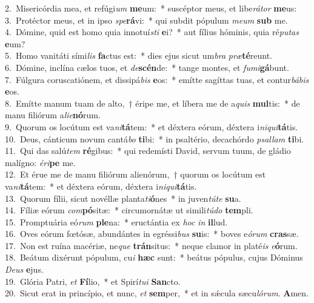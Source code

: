 {2.~}Misericórdia mea, et refúgi\textit{um} \textbf{me}um:~* suscéptor meus, et libe\textit{rá}\textit{tor} \textbf{me}us:\\
{3.~}Protéctor meus, et in ipso \textit{spe}\textbf{rá}vi:~* qui subdit pópulum \textit{me}\textit{um} \textbf{sub} me.\\
{4.~}Dómine, quid est homo quia innotuí\textit{sti} \textbf{e}i?~* aut fílius hóminis, quia ré\textit{pu}\textit{tas} \textbf{e}um?\\
{5.~}Homo vanitáti sími\textit{lis} \textbf{fa}ctus est:~* dies ejus sicut um\textit{bra} \textit{præ}\textbf{té}reunt.\\
{6.~}Dómine, inclína cælos tuos, et \textit{de}\textbf{scén}de:~* tange montes, et \textit{fu}\textit{mi}\textbf{gá}bunt.\\
{7.~}Fúlgura coruscatiónem, et dissipá\textit{bis} \textbf{e}os:~* emítte sagíttas tuas, et contur\textit{bá}\textit{bis} \textbf{e}os.\\
{8.~}Emítte manum tuam de alto,~† éripe me, et líbera me de a\textit{quis} \textbf{mul}tis:~* de manu filiórum a\textit{li}\textit{e}\textbf{nó}rum.\\
{9.~}Quorum os locútum est va\textit{ni}\textbf{tá}tem:~* et déxtera eórum, déxtera i\textit{ni}\textit{qui}\textbf{tá}tis.\\
{10.~}Deus, cánticum novum cantá\textit{bo} \textbf{ti}bi:~* in psaltério, decachórdo \textit{psal}\textit{lam} \textbf{ti}bi.\\
{11.~}Qui das salú\textit{tem} \textbf{ré}gibus:~* qui redemísti David, servum tuum, de gládio malígno: \textit{é}\textit{ri}\textbf{pe} me.\\
{12.~}Et érue me de manu filiórum alienórum,~† quorum os locútum est va\textit{ni}\textbf{tá}tem:~* et déxtera eórum, déxtera i\textit{ni}\textit{qui}\textbf{tá}tis.\\
{13.~}Quorum fílii, sicut novéllæ planta\textit{ti}\textbf{ó}nes~* in juven\textit{tú}\textit{te} \textbf{su}a.\\
{14.~}Fíliæ eórum \textit{com}\textbf{pó}sitæ:~* circumornátæ ut simili\textit{tú}\textit{do} \textbf{tem}pli.\\
{15.~}Promptuária eó\textit{rum} \textbf{ple}na:~* eructántia ex \textit{hoc} \textit{in} \textbf{il}lud.\\
{16.~}Oves eórum fœtósæ, abundántes in egréssi\textit{bus} \textbf{su}is:~* boves e\textit{ó}\textit{rum} \textbf{cras}sæ.\\
{17.~}Non est ruína macériæ, ne\textit{que} \textbf{trán}situs:~* neque clamor in platé\textit{is} \textit{e}\textbf{ó}rum.\\
{18.~}Beátum dixérunt pópulum, cu\textit{i} \textbf{hæc} sunt:~* beátus pópulus, cujus Dóminus \textit{De}\textit{us} \textbf{e}jus.\\
{19.~}Glória Patri, \textit{et} \textbf{Fí}lio,~* et Spirí\textit{tu}\textit{i} \textbf{San}cto.\\
{20.~}Sicut erat in princípio, et nunc, \textit{et} \textbf{sem}per,~* et in sǽcula sæcu\textit{ló}\textit{rum}. \textbf{A}men.\\
